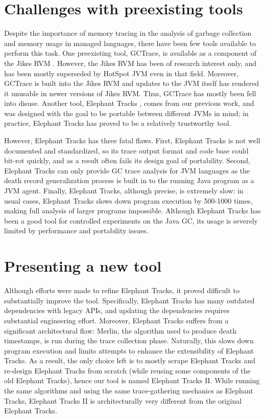\section{Challenges with preexisting tools}
Despite the importance of memory tracing in the analysis of garbage collection and memory usage in managed languages, there have
been few tools available to perform this task. One preexisting tool, GCTrace, is available as a component of the Jikes RVM \citep{JikesRVM}. However,
the Jikes RVM has been of research interest only, and has been mostly superseded by HotSpot JVM even in that field. Moreover, GCTrace
is built into the Jikes RVM and updates to the JVM itself has rendered it unusable in newer versions of Jikes RVM. Thus, GCTrace has
mostly been fell into disuse. Another tool, Elephant Tracks \citep{ElephantTracks}, comes from our previous work, and was designed with
the goal to be portable between different JVMs in mind; in practice, Elephant Tracks has proved to be a relatively trustworthy tool.

However, Elephant Tracks has three fatal flaws. First, Elephant Tracks is not well documented and standardized, so its trace output
format and code base could bit-rot quickly, and as a result often fails its design goal of portability. Second, Elephant Tracks can
only provide GC trace analysis for JVM languages as the death record generalization process is built in to the running Java program
as a JVM agent. Finally, Elephant Tracks, although precise, is extremely slow: in usual cases, Elephant Tracks slows down program execution
by 500-1000 times, making full analysis of larger programs impossible. Although Elephant Tracks has been a good tool for controlled
experiments on the Java GC, its usage is severely limited by performance and portability issues.


\section{Presenting a new tool}
Although efforts were made to refine Elephant Tracks, it proved difficult to substantially improve the tool. Specifically, Elephant Tracks
has many outdated dependencies with legacy APIs, and updating the dependencies requires substantial engineering effort. Moreover,
Elephant Tracks suffers from a significant architectural flaw: Merlin, the algorithm used to produce death timestamps,
is run during the trace collection phase. Naturally, this slows down program execution and limits attempts to enhance the extensibility
of Elephant Tracks. As a result, the only choice left is to mostly scrape Elephant Tracks and re-design Elephant Tracks from scratch
(while reusing some components of the old Elephant Tracks), hence our tool is named Elephant Tracks II. While running the same algorithms and
using the same trace-gathering mechanics as Elephant Tracks, Elephant Tracks II is architecturally very different from the original Elephant
Tracks.

